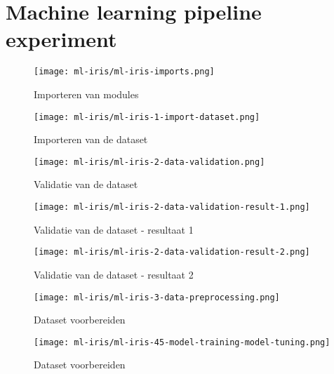 \section{Machine learning pipeline experiment}\label{appendix:ml-pipeline-experiment}

\begin{figure}[hbt!]
  \centering
  \texttt{[image: ml-iris/ml-iris-imports.png]}
  \caption{Importeren van modules}
  \label{fig:appendix:ml-iris-imports}
\end{figure}

\begin{figure}[hbt!]
  \centering
  \texttt{[image: ml-iris/ml-iris-1-import-dataset.png]}
  \caption{Importeren van de dataset}
  \label{fig:appendix:ml-iris-1-import-dataset}
\end{figure}

\begin{figure}[hbt!]
  \centering
  \texttt{[image: ml-iris/ml-iris-2-data-validation.png]}
  \caption{Validatie van de dataset}
  \label{fig:appendix:ml-iris-2-data-validation}
\end{figure}

\clearpage

\begin{figure}[hbt!]
  \centering
  \begin{minipage}{0.5\textwidth}
      \centering
      \texttt{[image: ml-iris/ml-iris-2-data-validation-result-1.png]}
      \caption{Validatie van de dataset - resultaat 1}
      \label{fig:appendix:ml-iris-2-data-validation-result-1}
  \end{minipage}\hfill
  \begin{minipage}{0.5\textwidth}
      \centering
      \texttt{[image: ml-iris/ml-iris-2-data-validation-result-2.png]}
      \caption{Validatie van de dataset - resultaat 2}
      \label{fig:appendix:ml-iris-2-data-validation-result-2}
  \end{minipage}
\end{figure}

\begin{figure}[hbt!]
  \centering
  \texttt{[image: ml-iris/ml-iris-3-data-preprocessing.png]}
  \caption{Dataset voorbereiden}
  \label{fig:appendix:ml-iris-3-data-preprocessing}
\end{figure}

\begin{figure}[hbt!]
  \centering
  \texttt{[image: ml-iris/ml-iris-45-model-training-model-tuning.png]}
  \caption{Dataset voorbereiden}
  \label{fig:ml-iris-45-model-training-model-tuning}
\end{figure}

